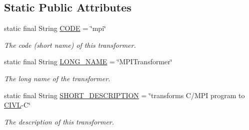 \subsection*{Static Public Attributes}
\begin{DoxyCompactItemize}
\item 
\hypertarget{classedu_1_1udel_1_1cis_1_1vsl_1_1civl_1_1transform_1_1IF_1_1MPI2CIVLTransformer_a0dafddb2d6f4f182a29c84b712883064}{}static final String \hyperlink{classedu_1_1udel_1_1cis_1_1vsl_1_1civl_1_1transform_1_1IF_1_1MPI2CIVLTransformer_a0dafddb2d6f4f182a29c84b712883064}{C\+O\+D\+E} = \char`\"{}mpi\char`\"{}\label{classedu_1_1udel_1_1cis_1_1vsl_1_1civl_1_1transform_1_1IF_1_1MPI2CIVLTransformer_a0dafddb2d6f4f182a29c84b712883064}

\begin{DoxyCompactList}\small\item\em The code (short name) of this transformer. \end{DoxyCompactList}\item 
\hypertarget{classedu_1_1udel_1_1cis_1_1vsl_1_1civl_1_1transform_1_1IF_1_1MPI2CIVLTransformer_a7e67a6f9870d09aa90aa38110e129365}{}static final String \hyperlink{classedu_1_1udel_1_1cis_1_1vsl_1_1civl_1_1transform_1_1IF_1_1MPI2CIVLTransformer_a7e67a6f9870d09aa90aa38110e129365}{L\+O\+N\+G\+\_\+\+N\+A\+M\+E} = \char`\"{}M\+P\+I\+Transformer\char`\"{}\label{classedu_1_1udel_1_1cis_1_1vsl_1_1civl_1_1transform_1_1IF_1_1MPI2CIVLTransformer_a7e67a6f9870d09aa90aa38110e129365}

\begin{DoxyCompactList}\small\item\em The long name of the transformer. \end{DoxyCompactList}\item 
\hypertarget{classedu_1_1udel_1_1cis_1_1vsl_1_1civl_1_1transform_1_1IF_1_1MPI2CIVLTransformer_aca3097452db5dcec45ed02d7ea18bd74}{}static final String \hyperlink{classedu_1_1udel_1_1cis_1_1vsl_1_1civl_1_1transform_1_1IF_1_1MPI2CIVLTransformer_aca3097452db5dcec45ed02d7ea18bd74}{S\+H\+O\+R\+T\+\_\+\+D\+E\+S\+C\+R\+I\+P\+T\+I\+O\+N} = \char`\"{}transforms C/M\+P\+I program to \hyperlink{classedu_1_1udel_1_1cis_1_1vsl_1_1civl_1_1CIVL}{C\+I\+V\+L}-\/C\char`\"{}\label{classedu_1_1udel_1_1cis_1_1vsl_1_1civl_1_1transform_1_1IF_1_1MPI2CIVLTransformer_aca3097452db5dcec45ed02d7ea18bd74}

\begin{DoxyCompactList}\small\item\em The description of this transformer. \end{DoxyCompactList}\end{DoxyCompactItemize}


